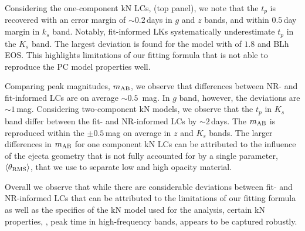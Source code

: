 Considering the one-component \ac{kN} \acp{LC}, (top panel), we note that the $t_p$ is 
recovered with an error margin of ${\sim}0.2\,$days in $g$ and $z$ bands, and within 
$0.5\,$day margin in $k_s$ band. Notably, fit-informed \acp{LK} 
systematically underestimate $t_p$ in the $K_s$ band. 
%
The largest deviation is found for the 
model with \mr{} of $1.8$ and BLh \ac{EOS}. This highlights limitations of our 
fitting formula that is not able to reproduce the \ac{PC} model properties well.

Comparing peak magnitudes, $m_{\rm AB}$, we observe that differences 
between \ac{NR}- and fit-informed \acp{LC} are on average ${\sim}0.5$~mag. 
In $g$ band, however, the deviations are ${\sim}1\,$mag.
Considering two-component \ac{kN} models, we observe that the 
$t_p$ in $K_s$ band differ between the fit- and \ac{NR}-informed \acp{LC} by 
${\sim}2\,$days. The $m_{\rm AB}$ is reproduced within the ${\pm}0.5\,$mag 
on average in $z$ and $K_s$ bands.
%
The larger differences in $m_{\rm AB}$ for one component \ac{kN} \acp{LC} 
can be attributed to the influence of the ejecta geometry that is not 
fully accounted for by a single parameter, $\langle\theta_{\rm RMS}\rangle$, that we use to 
separate low and high opacity material. 

Overall we observe that while there are considerable deviations between fit- and 
\ac{NR}-informed \acp{LC} that can be attributed to the limitations of 
our fitting formula as well as the specifics of the \ac{kN} model used for the 
analysis, certain \ac{kN} properties, \eg, peak time in high-frequency bands, 
appears to be captured robustly. 

